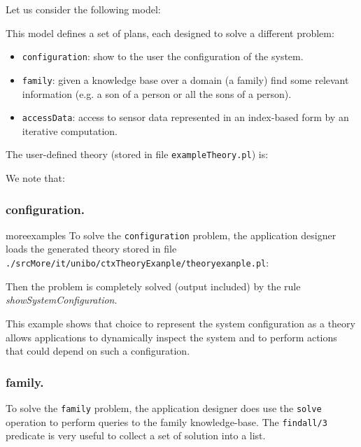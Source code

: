Let us consider the following model:

  

This model defines a set of plans, each designed to solve a different problem:

\begin{itemize}
\item \texttt{configuration}: show to the user the configuration of the system.
\item \texttt{family}: given a knowledge base over a domain (a family) find some relevant information (e.g. a son of a person or all the sons of a person).
\item \texttt{accessData}: access to sensor data represented in an index-based form by an iterative computation.
\end{itemize}

The user-defined theory (stored in file \texttt{exampleTheory.pl}) is:

  

We note that:
\subsubsection{configuration.}
moreexamples
To solve the \texttt{configuration} problem, the application designer loads the generated theory stored in file
 \texttt{./srcMore/it/unibo/ctxTheoryExanple/theoryexanple.pl}:


 
Then the problem is completely solved (output included) by the \tuprolog{} rule \textit{showSystemConfiguration}.

This example shows that choice to represent the system configuration as a theory allows applications to dynamically inspect the system and to perform actions that could depend on such a configuration.

\subsubsection{family.}
To solve the \texttt{family} problem, the application designer does use the \texttt{solve} operation to perform queries to the family knowledge-base. The \texttt{findall/3} predicate is very useful to collect a set of solution into a list.

